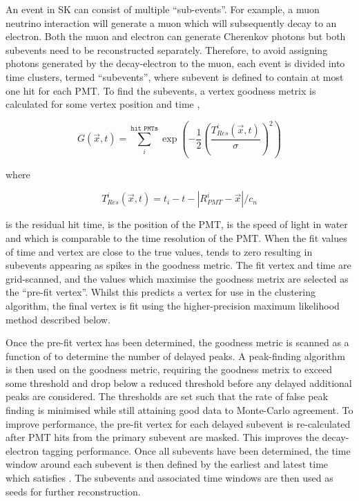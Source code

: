 An event in SK can consist of multiple ``sub-events''. For example, a muon neutrino interaction will generate a muon which will subsequently decay to an electron. Both the muon and electron can generate Cherenkov photons but both subevents need to be reconstructed separately. Therefore, to avoid assigning photons generated by the decay-electron to the muon, each event is divided into time clusters, termed ``subevents'', where subevent is defined to contain at most one hit for each PMT. To find the subevents, a vertex goodness metrix is calculated for some vertex position  and time ,

\begin{equation}
  G(\vec{x},t) = \sum^{\texttt{hit PMTs}}_{i} \exp \left( - \frac{1}{2} \left( \frac{T_{Res}^{i}(\vec{x},t)}{\sigma} \right)^{2} \right)
\end{equation}

where

\begin{equation}
  T_{Res}^{i}(\vec{x},t) = t_{i} - t - \left| R^{i}_{PMT} - \vec{x} \right|/c_{n}
\end{equation}

is the residual hit time,  is the position of the  PMT,  is the speed of light in water and  which is comparable to the time resolution of the PMT. When the fit values of time and vertex are close to the true values,  tends to zero resulting in subevents appearing as spikes in the goodness metric. The fit vertex and time are grid-scanned, and the values which maximise the goodness metrix are selected as the ``pre-fit vertex''. Whilst this predicts a vertex for use in the clustering algorithm, the final vertex is fit using the higher-precision maximum likelihood method described below.

Once the pre-fit vertex has been determined, the goodness metric is scanned as a function of  to determine the number of delayed peaks. A peak-finding algorithm is then used on the goodness metric, requiring the goodness metrix to exceed some threshold and drop below a reduced threshold before any delayed additional peaks are considered. The thresholds are set such that the rate of false peak finding is minimised while still attaining good data to Monte-Carlo agreement. To improve performance, the pre-fit vertex for each delayed subevent is re-calculated after PMT hits from the primary subevent are masked. This improves the decay-electron tagging performance. Once all subevents have been determined, the time window around each subevent is then defined by the earliest and latest time which satisfies . The subevents and associated time windows are then used as seeds for further reconstruction.

